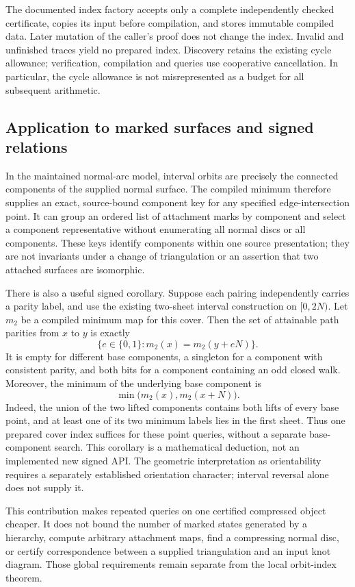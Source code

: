 The documented index factory accepts only a complete independently checked
certificate, copies its input before compilation, and stores immutable
compiled data.  Later mutation of the caller's proof does not change the
index.  Invalid and unfinished traces yield no prepared index.  Discovery
retains the existing cycle allowance; verification, compilation and queries
use cooperative cancellation.  In particular, the cycle allowance is not
misrepresented as a budget for all subsequent arithmetic.

\subsection{Application to marked surfaces and signed relations}

In the maintained normal-arc model, interval orbits are precisely the
connected components of the supplied normal surface.  The compiled minimum
therefore supplies an exact, source-bound component key for any specified
edge-intersection point.  It can group an ordered list of attachment marks
by component and select a component representative without enumerating all
normal discs or all components.  These keys identify components within
one source presentation; they are not invariants under a change of
triangulation or an assertion that two attached surfaces are isomorphic.

There is also a useful signed corollary.  Suppose each pairing independently
carries a parity label, and use the existing two-sheet interval construction
on $[0,2N)$.  Let $m_2$ be a compiled minimum map for this cover.  Then the
set of attainable path parities from $x$ to $y$ is exactly
\[
 \{e\in\{0,1\}:m_2(x)=m_2(y+eN)\}.
\]
It is empty for different base components, a singleton for a component with
consistent parity, and both bits for a component containing an odd closed
walk.  Moreover, the minimum of the underlying base component is
\[
 \min\bigl(m_2(x),m_2(x+N)\bigr).
\]
Indeed, the union of the two lifted components contains both lifts of every
base point, and at least one of its two minimum labels lies in the first
sheet.  Thus one prepared cover index suffices for these point queries,
without a separate base-component search.  This corollary is a mathematical
deduction, not an implemented new signed API.  The geometric interpretation
as orientability requires a separately established orientation character;
interval reversal alone does not supply it.

This contribution makes repeated queries on one certified compressed object
cheaper.  It does not bound the number of marked states generated by a
hierarchy, compute arbitrary attachment maps, find a compressing normal
disc, or certify correspondence between a supplied triangulation and an
input knot diagram.  Those global requirements remain separate from the
local orbit-index theorem.
